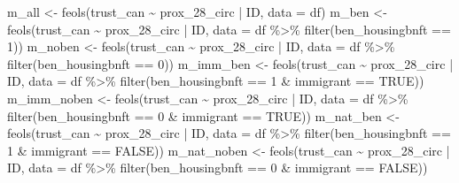\documentclass[
  letterpaper,
  DIV=11,
  numbers=noendperiod]{scrartcl}
\newenvironment{Shaded}{\begin{snugshade}}{\end{snugshade}}
\newcommand{\AttributeTok}[1]{\textcolor[rgb]{0.40,0.45,0.13}{#1}}
\newcommand{\ConstantTok}[1]{\textcolor[rgb]{0.56,0.35,0.01}{#1}}
\newcommand{\DecValTok}[1]{\textcolor[rgb]{0.68,0.00,0.00}{#1}}
\newcommand{\FunctionTok}[1]{\textcolor[rgb]{0.28,0.35,0.67}{#1}}
\newcommand{\NormalTok}[1]{\textcolor[rgb]{0.00,0.23,0.31}{#1}}
\newcommand{\OtherTok}[1]{\textcolor[rgb]{0.00,0.23,0.31}{#1}}
\newcommand{\SpecialCharTok}[1]{\textcolor[rgb]{0.37,0.37,0.37}{#1}}
\begin{document}
\begin{Shaded}
\begin{Highlighting}[]
\NormalTok{m\_all }\OtherTok{\textless{}{-}} \FunctionTok{feols}\NormalTok{(trust\_can }\SpecialCharTok{\textasciitilde{}}\NormalTok{ prox\_28\_circ }\SpecialCharTok{|}\NormalTok{ ID, }\AttributeTok{data =}\NormalTok{ df)}
\NormalTok{m\_ben }\OtherTok{\textless{}{-}} \FunctionTok{feols}\NormalTok{(trust\_can }\SpecialCharTok{\textasciitilde{}}\NormalTok{ prox\_28\_circ }\SpecialCharTok{|}\NormalTok{ ID,}
               \AttributeTok{data =}\NormalTok{ df }\SpecialCharTok{\%\textgreater{}\%} \FunctionTok{filter}\NormalTok{(ben\_housingbnft }\SpecialCharTok{==} \DecValTok{1}\NormalTok{))}
\NormalTok{m\_noben }\OtherTok{\textless{}{-}} \FunctionTok{feols}\NormalTok{(trust\_can }\SpecialCharTok{\textasciitilde{}}\NormalTok{ prox\_28\_circ }\SpecialCharTok{|}\NormalTok{ ID,}
                 \AttributeTok{data =}\NormalTok{ df }\SpecialCharTok{\%\textgreater{}\%} \FunctionTok{filter}\NormalTok{(ben\_housingbnft }\SpecialCharTok{==} \DecValTok{0}\NormalTok{))}
\NormalTok{m\_imm\_ben }\OtherTok{\textless{}{-}} \FunctionTok{feols}\NormalTok{(trust\_can }\SpecialCharTok{\textasciitilde{}}\NormalTok{ prox\_28\_circ }\SpecialCharTok{|}\NormalTok{ ID,}
                   \AttributeTok{data =}\NormalTok{ df }\SpecialCharTok{\%\textgreater{}\%} \FunctionTok{filter}\NormalTok{(ben\_housingbnft }\SpecialCharTok{==} \DecValTok{1} \SpecialCharTok{\&}\NormalTok{ immigrant }\SpecialCharTok{==} \ConstantTok{TRUE}\NormalTok{))}
\NormalTok{m\_imm\_noben }\OtherTok{\textless{}{-}} \FunctionTok{feols}\NormalTok{(trust\_can }\SpecialCharTok{\textasciitilde{}}\NormalTok{ prox\_28\_circ }\SpecialCharTok{|}\NormalTok{ ID,}
                     \AttributeTok{data =}\NormalTok{ df }\SpecialCharTok{\%\textgreater{}\%} \FunctionTok{filter}\NormalTok{(ben\_housingbnft }\SpecialCharTok{==} \DecValTok{0} \SpecialCharTok{\&}\NormalTok{ immigrant }\SpecialCharTok{==} \ConstantTok{TRUE}\NormalTok{))}
\NormalTok{m\_nat\_ben }\OtherTok{\textless{}{-}} \FunctionTok{feols}\NormalTok{(trust\_can }\SpecialCharTok{\textasciitilde{}}\NormalTok{ prox\_28\_circ }\SpecialCharTok{|}\NormalTok{ ID,}
                   \AttributeTok{data =}\NormalTok{ df }\SpecialCharTok{\%\textgreater{}\%} \FunctionTok{filter}\NormalTok{(ben\_housingbnft }\SpecialCharTok{==} \DecValTok{1} \SpecialCharTok{\&}\NormalTok{ immigrant }\SpecialCharTok{==} \ConstantTok{FALSE}\NormalTok{))}
\NormalTok{m\_nat\_noben }\OtherTok{\textless{}{-}} \FunctionTok{feols}\NormalTok{(trust\_can }\SpecialCharTok{\textasciitilde{}}\NormalTok{ prox\_28\_circ }\SpecialCharTok{|}\NormalTok{ ID,}
                     \AttributeTok{data =}\NormalTok{ df }\SpecialCharTok{\%\textgreater{}\%} \FunctionTok{filter}\NormalTok{(ben\_housingbnft }\SpecialCharTok{==} \DecValTok{0} \SpecialCharTok{\&}\NormalTok{ immigrant }\SpecialCharTok{==} \ConstantTok{FALSE}\NormalTok{))}


\end{Highlighting}
\end{Shaded}
\end{document}

